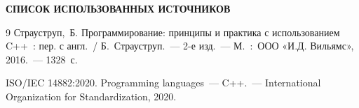 \clearpage
{}
{}

\begin{center}
	\LARGE\bfseries СПИСОК ИСПОЛЬЗОВАННЫХ ИСТОЧНИКОВ
\end{center}
\vspace{10pt}

\begingroup
\renewcommand{\chapter}[2]{}%
\begin{thebibliography}{9}
	Страуструп,~Б. Программирование: принципы и практика с использованием C++~: пер. с англ.~/ Б.~Страуструп.~--- 2-е изд.~--- М.~:~ООО «И.Д. Вильямс», 2016.~--- 1328~с.
	
	ISO/IEC 14882:2020. Programming languages~--- C++.~--- International Organization for Standardization, 2020.
\end{thebibliography}
\endgroup